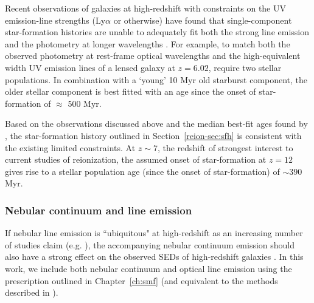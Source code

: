 Recent observations of galaxies at high-redshift with constraints on the UV emission-line strengths (Ly$\alpha$ or otherwise) have found that single-component star-formation histories are unable to adequately fit both the strong line emission and the photometry at longer wavelengths \citep{RodriguezEspinosa:2014cs,2015MNRAS.450.1846S}. For example, to match both the observed photometry at rest-frame optical wavelengths and the high-equivalent width UV emission lines of a lensed galaxy at $z = 6.02$, \citet{2015MNRAS.450.1846S} require two stellar populations. In combination with a `young' 10 Myr old starburst component, the older stellar component is best fitted with an age since the onset of star-formation of $\approx$ 500 Myr.

Based on the observations discussed above and the median best-fit ages found by \citet{2013MNRAS.429..302C}, the star-formation history outlined in Section~\ref{reion-sec:sfh} is consistent with the existing limited constraints. At $z\sim7$, the redshift of strongest interest to current studies of reionization, the assumed onset of star-formation at $z=12$ gives rise to a stellar population age (since the onset of star-formation) of $\sim390$ Myr. 

\subsubsection{Nebular continuum and line emission}\label{reion-sec:neb}
If nebular line emission is ``ubiquitous" at high-redshift as an increasing number of studies claim (e.g. \citet{Shim:2011cw,Stark:2013ix,2014ApJ...784...58S}), the accompanying nebular continuum emission should also have a strong effect on the observed SEDs of high-redshift galaxies \citep{Reines:2009gs}. In this work, we include both nebular continuum and optical line emission using the prescription outlined in Chapter~\ref{ch:smf} (and equivalent to the methods described in \citet{Ono:2010ed,2010A&A...515A..73S,2011MNRAS.418.2074M}). 

